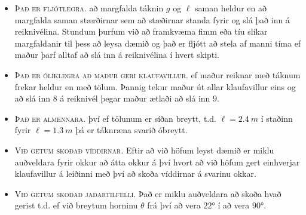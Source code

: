 \begin{itemize}
    \item \textsc{Það er fljótlegra.} að margfalda táknin $g$ og $\ell$ saman heldur en að margfalda saman stærðirnar sem að stæðirnar standa fyrir og slá það inn á reiknivélina. Stundum þurfum við að framkvæma fimm eða tíu slíkar margfaldanir til þess að leysa dæmið og það er fljótt að stela af manni tíma ef maður þarf alltaf að slá inn á reiknivélina í hvert skipti.
    
    \item \textsc{Það er ólíklegra að maður geri klaufavillur.} ef maður reiknar með táknum frekar heldur en með tölum. Þannig tekur maður út allar klaufavillur eins og að slá inn $8$ á reiknivél þegar maður ætlaði að slá inn $9$.
    
    \item \textsc{Það er almennara.} því ef tölunum er síðan breytt, t.d. $\ell = \SI{2.4}{m}$ í staðinn fyrir $\ell = \SI{1.3}{m}$ þá er táknræna svarið óbreytt.
    
    \item \textsc{Við getum skoðað víddirnar.} Eftir að við höfum leyst dæmið er miklu auðveldara fyrir okkur að átta okkur á því hvort að við höfum gert einhverjar klaufavillur á leiðinni með því að skoða víddirnar á svarinu okkar.
    
    
    \item \textsc{Við getum skoðað jaðartilfelli.} Það er miklu auðveldara að skoða hvað gerist t.d. ef við breytum horninu $\theta$ frá því að vera $\ang{22}$ í að vera $\ang{90}$.
\end{itemize}